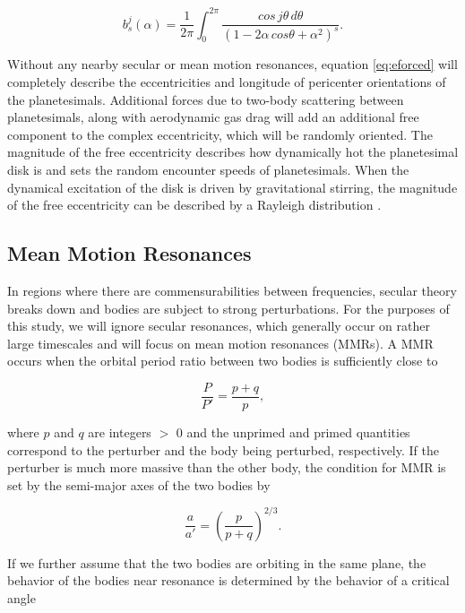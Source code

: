 \documentclass[onecolumn]{aastex63}
\begin{document}
\begin{equation}\label{eq:lap}
	b_{s}^{j}(\alpha) = \frac{1}{2 \pi} \int_{0}^{2 \pi} \frac{cos \, j \theta \, d \theta}{\left( 1 - 2 \alpha \, cos \theta + \alpha^2 \right)^{s}}.
\end{equation}

Without any nearby secular or mean motion resonances, equation \ref{eq:eforced} will completely describe the eccentricities and longitude of  
pericenter orientations of the planetesimals. Additional forces due to two-body scattering between planetesimals, along with 
aerodynamic gas drag will add an additional free component to the complex eccentricity, which will be randomly oriented. The 
magnitude of the free eccentricity describes how dynamically hot the planetesimal disk is and sets the random encounter speeds of 
planetesimals. When the dynamical excitation of the disk is driven by gravitational stirring, the magnitude of the free eccentricity can 
be described by a Rayleigh distribution \citep{1992Icar...96..107I}.

\subsection{Mean Motion Resonances}

In regions where there are commensurabilities between frequencies, secular theory breaks down and bodies are subject to strong 
perturbations. For the purposes of this study, we will ignore secular resonances, which generally occur on rather large timescales 
and will focus on mean motion resonances (MMRs). A MMR occurs  when the orbital period ratio between two bodies is sufficiently 
close to

\begin{equation}\label{eq:per_mmr}
	\frac{P}{P'} = \frac{p + q}{p},
\end{equation}

\noindent where  $p$ and $q$ are integers $>$ 0 and the unprimed and primed quantities correspond to the perturber and the body 
being perturbed, respectively. If the perturber is much more massive than the other body, the condition for MMR is set  by the semi-major 
axes of the two bodies by

\begin{equation}\label{eq:a_mmr}
	\frac{a}{a'} = \left( \frac{p}{p + q} \right)^{2/3}.
\end{equation}

If we further assume that the two bodies are orbiting in the same plane, the behavior of the bodies near resonance is determined by the
behavior of a critical angle
\end{document}
